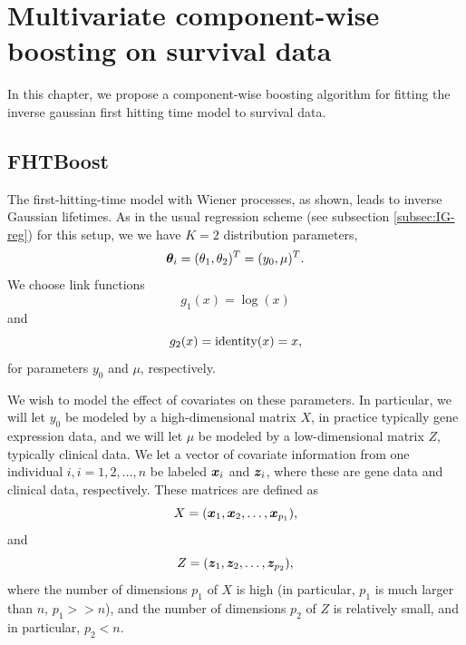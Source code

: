 \chapter{Multivariate component-wise boosting on survival data}
\label{ch:FHTboost}
In this chapter, we propose a component-wise boosting algorithm for fitting the inverse gaussian first hitting time model to survival data.

\section{FHTBoost}
The first-hitting-time model with Wiener processes, as shown, leads to inverse Gaussian lifetimes. As in the usual
regression scheme (see subsection \ref{subsec:IG-reg}) for this setup, we we have $K=2$ distribution parameters,
\begin{equation}
    \boldsymbol{\theta}_i=(\theta_1,\theta_2)^T=(y_0,\mu)^T.
\end{equation}
We choose link functions
\begin{equation}
    g_1(x)=\log(x)
\end{equation}
and
\begin{equation}
    g_2(x)=\operatorname{identity}(x)=x,
\end{equation}
for parameters $y_0$ and $\mu$, respectively.

We wish to model the effect of covariates on these parameters. In particular, we will let $y_0$ be modeled by a high-dimensional matrix $X$,
in practice typically gene expression data, and we will let $\mu$ be modeled by a low-dimensional matrix $Z$, typically clinical data.
We let a vector of covariate information from one individual $i,i=1,2,\ldots,n$ be labeled $\bm{x}_i$ and $\bm{z}_i$, where these are
gene data and clinical data, respectively.
These matrices are defined as
\begin{equation}
    X=(\bm{x}_1,\bm{x}_2,\ldots,\bm{x}_{p_1}),
\end{equation}
and
\begin{equation}
    Z=(\bm{z}_1,\bm{z}_2,\ldots,\bm{z}_{p_2}),
\end{equation}
where the number of dimensions $p_1$ of $X$ is high (in particular, $p_1$ is much larger than $n$, $p_1 >> n$),
and the number of dimensions $p_2$ of $Z$ is relatively small, and in particular, $p_2 < n$.

